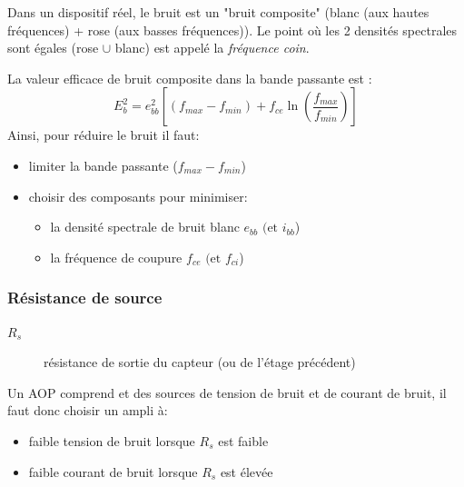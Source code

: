 Dans un dispositif réel, le bruit est un "bruit composite" (blanc (aux hautes fréquences) + rose (aux basses fréquences)). Le point où les 2 densités spectrales sont égales (rose \(\cup\) blanc) est appelé la \emph{fréquence coin}.
\begin{figure}[H]
	\centering
\end{figure}
La valeur efficace de bruit composite dans la bande passante est :
\begin{equation}
E_b^2 = e_{bb}^2\left[(f_{max}-f_{min})+f_{ce}\ln\left(\frac{f_{max}}{f_{min}}\right)\right]
\end{equation}
Ainsi, pour réduire le bruit il faut:
\begin{itemize}
	\item limiter la bande passante (\(f_{max}-f_{min}\))
	\item choisir des composants pour minimiser:
	\begin{itemize}
		\item la densité spectrale de bruit blanc \(e_{bb}\text{ (et }i_{bb}\))
		\item la fréquence de coupure \(f_{ce}\text{ (et }f_{ci}\))
	\end{itemize}
\end{itemize}
\subsubsection{Résistance de source} \label{subsubsec:résistsource}
\begin{description}
	\item[\(R_s\)] résistance de sortie du capteur (ou de l'étage précédent)
\end{description}
Un AOP comprend et des sources de tension de bruit et de courant de bruit, il faut donc choisir un ampli à:
\begin{itemize}
	\item faible tension de bruit lorsque \(R_s\) est faible
	\item faible courant de bruit lorsque \(R_s\) est élevée
\end{itemize}
